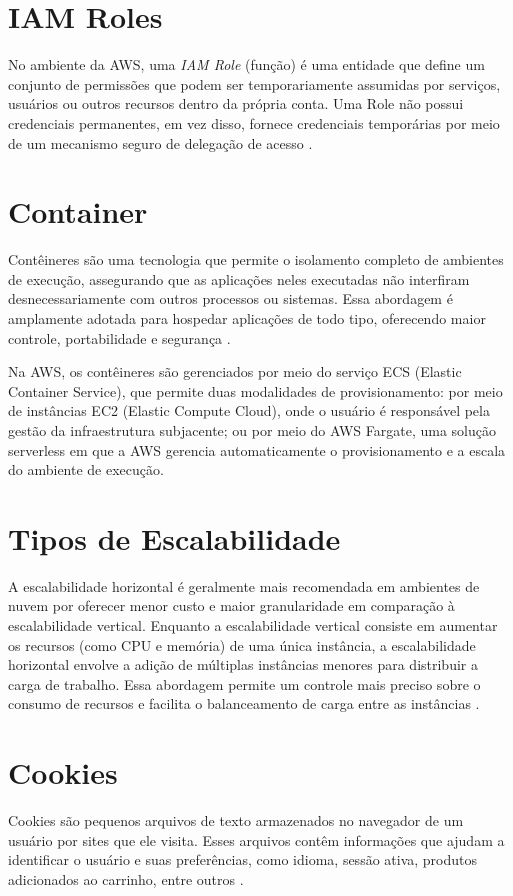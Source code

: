 \section{IAM Roles}No ambiente da AWS, uma \textit{IAM Role} (função) é uma entidade que define um conjunto de permissões que podem ser temporariamente assumidas por serviços, usuários ou outros recursos dentro da própria conta. Uma Role não possui credenciais permanentes, em vez disso, fornece credenciais temporárias por meio de um mecanismo seguro de delegação de acesso \cite{marques2024iamrole}.

\section{Container}Contêineres são uma tecnologia que permite o isolamento completo de ambientes de execução, assegurando que as aplicações neles executadas não interfiram desnecessariamente com outros processos ou sistemas. Essa abordagem é amplamente adotada para hospedar aplicações de todo tipo, oferecendo maior controle, portabilidade e segurança \cite{redhat2024containers}.

Na AWS, os contêineres são gerenciados por meio do serviço ECS (Elastic Container Service), que permite duas modalidades de provisionamento: por meio de instâncias EC2 (Elastic Compute Cloud), onde o usuário é responsável pela gestão da infraestrutura subjacente; ou por meio do AWS Fargate, uma solução serverless em que a AWS gerencia automaticamente o provisionamento e a escala do ambiente de execução.

\section{Tipos de Escalabilidade}A escalabilidade horizontal é geralmente mais recomendada em ambientes de nuvem por oferecer menor custo e maior granularidade em comparação à escalabilidade vertical. Enquanto a escalabilidade vertical consiste em aumentar os recursos (como CPU e memória) de uma única instância, a escalabilidade horizontal envolve a adição de múltiplas instâncias menores para distribuir a carga de trabalho. Essa abordagem permite um controle mais preciso sobre o consumo de recursos e facilita o balanceamento de carga entre as instâncias \cite{lucidchart2024escalabilidade}.


\section{Cookies}Cookies são pequenos arquivos de texto armazenados no navegador de um usuário por sites que ele visita. Esses arquivos contêm informações que ajudam a identificar o usuário e suas preferências, como idioma, sessão ativa, produtos adicionados ao carrinho, entre outros \cite{kaspersky2024cookies}.

